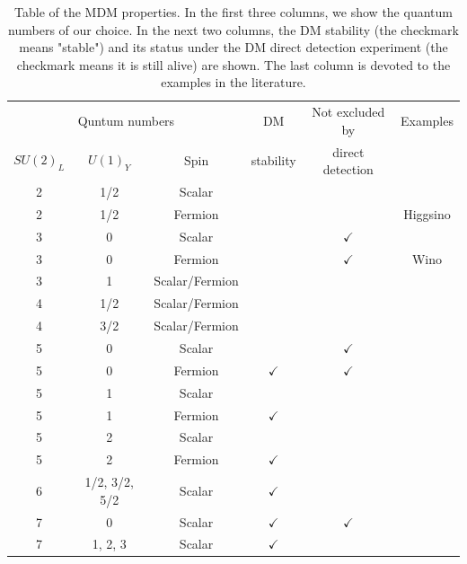 \documentclass[12pt,twoside,book]{article}
\begin{document}
\begin{table}
  \centering
  \begin{tabular}{ccc|c|c|c}
    \multicolumn{3}{c|}{Quntum numbers} & DM & Not excluded by & Examples\\
    $SU(2)_L$ & $U(1)_Y$ & Spin & stability & direct detection & \\ \hline
    \hline
    2 & 1/2 & Scalar & & & \\
    2 & 1/2 & Fermion & & & Higgsino\\ \hline
    3 & 0 & Scalar & & $\checkmark$ & \cite{Farina:2013mla} \\
    3 & 0 & Fermion & & $\checkmark$ & Wino\\
    3 & 1 & Scalar/Fermion & & & \cite{Farina:2013mla} \\ \hline
    4 & 1/2 & Scalar/Fermion & & & \cite{Farina:2013mla} \\
    4 & 3/2 & Scalar/Fermion & & & \cite{Farina:2013mla} \\ \hline
    5 & 0 & Scalar & & $\checkmark$ & \cite{Farina:2013mla} \\
    5 & 0 & Fermion & $\checkmark$ & $\checkmark$ &
      \cite{Cirelli:2005uq, Cirelli:2007xd, Cirelli:2009uv} \\
    5 & 1 & Scalar & & & \\
    5 & 1 & Fermion & $\checkmark$ & & \\
    5 & 2 & Scalar & & & \\
    5 & 2 & Fermion & $\checkmark$ & & \\ \hline
    6 & 1/2, 3/2, 5/2 & Scalar & $\checkmark$ & & \\ \hline
    7 & 0 & Scalar & $\checkmark$ & $\checkmark$ &
      \cite{Cirelli:2005uq, Cirelli:2007xd, Cirelli:2009uv} \\
    7 & 1, 2, 3 & Scalar & $\checkmark$ & & \\
  \end{tabular}
  \caption{
    Table of the MDM properties.
    In the first three columns, we show the quantum numbers of our choice.
    In the next two columns, the DM stability (the checkmark means "stable") and its status under the DM direct detection experiment (the checkmark means it is still alive) are shown.
    The last column is devoted to the examples in the literature.
  }
  \label{tab:mdms}
\end{table}
\end{document}
